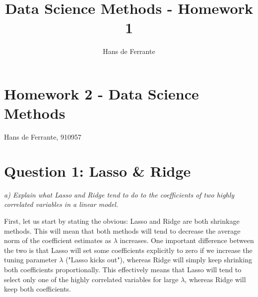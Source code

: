 \documentclass[a4paper,titlepage,onecolumn,table]{article}
\title{Data Science Methods - Homework 1}
\author{Hans de Ferrante}
\begin{document}
	
	\section*{Homework 2 - Data Science Methods}
	Hans de Ferrante, 910957
	
	\section{Question 1: Lasso \& Ridge}
	\textit{a) Explain what Lasso and Ridge tend to do to the coefficients of two highly correlated variables in a linear model.}\\[0.2cm]
	\par First, let us start by stating the obvious: Lasso and Ridge are both shrinkage methods. This will mean that both methods will tend to decrease the average norm of the coefficient estimates as $\lambda$ increases. One important difference between the two is that Lasso will set some coefficients explicitly to zero if we increase the tuning parameter $\lambda$ ("Lasso kicks out"), whereas Ridge will simply keep shrinking both coefficients proportionally. This effectively means that Lasso will tend to select only one of the highly correlated variables for large $\lambda$, whereas Ridge will keep both coefficients. \\[0.2cm]
	
\end{document}
